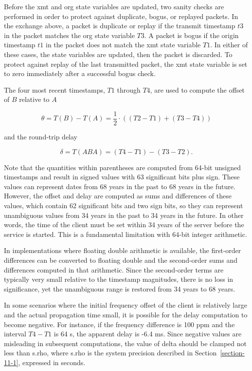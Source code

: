 Before the xmt and org state variables are updated, two sanity checks
are performed in order to protect against duplicate, bogus, or
replayed packets. In the exchange above, a packet is duplicate or
replay if the transmit timestamp $ t3 $ in the packet matches the org
state variable $ T3 $. A packet is bogus if the origin timestamp $ t1 $ in
the packet does not match the xmt state variable $ T1 $. In either of
these cases, the state variables are updated, then the packet is
discarded. To protect against replay of the last transmitted packet,
the xmt state variable is set to zero immediately after a successful
bogus check.

The four most recent timestamps, $ T1 $ through $ T4 $, are used to compute
the offset of $ B $ relative to $ A $

$$
\theta = T(B) - T(A) = \frac{1}{2} \cdot ((T2 - T1) + (T3 - T4))
$$

and the round-trip delay

$$
\delta = T(ABA) = (T4 - T1) - (T3 - T2).
$$

Note that the quantities within parentheses are computed from 64-bit
unsigned timestamps and result in signed values with 63 significant
bits plus sign. These values can represent dates from 68 years in
the past to 68 years in the future. However, the offset and delay
are computed as sums and differences of these values, which contain
62 significant bits and two sign bits, so they can represent
unambiguous values from 34 years in the past to 34 years in the
future. In other words, the time of the client must be set within 34
years of the server before the service is started. This is a
fundamental limitation with 64-bit integer arithmetic.

In implementations where floating double arithmetic is available, the
first-order differences can be converted to floating double and the
second-order sums and differences computed in that arithmetic. Since
the second-order terms are typically very small relative to the
timestamp magnitudes, there is no loss in significance, yet the
unambiguous range is restored from 34 years to 68 years.

In some scenarios where the initial frequency offset of the client is
relatively large and the actual propagation time small, it is
possible for the delay computation to become negative. For instance,
if the frequency difference is 100 ppm and the interval $ T4 - T1 $ is 64
s, the apparent delay is -6.4 ms. Since negative values are
misleading in subsequent computations, the value of delta should be
clamped not less than s.rho, where s.rho is the system precision
described in Section~\ref{section-11-1}, expressed in seconds.

